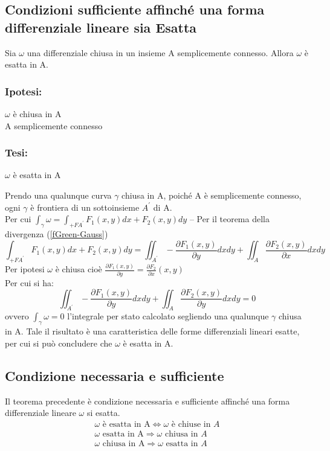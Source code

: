 \subsection{Condizioni sufficiente affinché una forma differenziale lineare sia Esatta}
\begin{defi}
  Sia $\omega$ una differenziale chiusa in un insieme A semplicemente connesso.
  Allora $\omega$ è esatta in A.
  \begin{multicols}{2}
    \subsubsection{Ipotesi:}
    $\omega$ è chiusa in A\\
    A semplicemente connesso
    \subsubsection{Tesi:}
    $\omega$ è esatta in A
  \end{multicols}
  Prendo una qualunque curva $\gamma$ chiusa in A, poiché A è semplicemente connesso,
  ogni $\gamma$ è frontiera di un sottoinsieme $A^\prime$ di A.\\
  Per cui $\int_\gamma \omega =\int_{+FA^\prime}F_1(x,y)dx+F_2(x,y)dy$ --
  Per il teorema della divergenza (\ref{fGreen-Gauss})
  \begin{equation*}
    \int_{+FA^\prime}F_1(x,y)dx+F_2(x,y)dy=\iint_{A^\prime}-
    \frac{\partial F_1(x,y)}{\partial y} dxdy+
    \iint_A\frac{\partial F_2(x,y)}{\partial x} dxdy
  \end{equation*}
  Per ipotesi $\omega$ è chiusa cioè $\frac{\partial F_1(x,y)}{\partial y}=
  \frac{\partial F_2}{\partial x}(x,y)$\\
  Per cui si ha:
  \begin{equation*}
    \iint_{A^\prime}-
    \frac{\partial F_1(x,y)}{\partial y} dxdy+
    \iint_A\frac{\partial F_2(x,y)}{\partial y} dxdy=0
  \end{equation*}
  ovvero $\int_\gamma \omega =0$ l'integrale per stato calcolato segliendo una qualunque
  $\gamma$ chiusa in A. Tale il risultato è una caratteristica delle forme differenziali
  lineari esatte, per cui si può concludere che $\omega$ è esatta in A.
\end{defi}
\subsection{Condizione necessaria e sufficiente}
Il teorema precedente è condizione necessaria e sufficiente affinché una forma differenziale lineare $\omega$ si esatta.
\begin{eqnarray*}
  \omega \text{ è esatta in A} \Leftrightarrow \omega \text{ è chiuse in } A\\
  \omega \text{ esatta in A} \Rightarrow \omega \text{ chiusa in } A\\
  \omega \text{ chiusa in A} \Rightarrow \omega \text{ esatta in } A
\end{eqnarray*}
